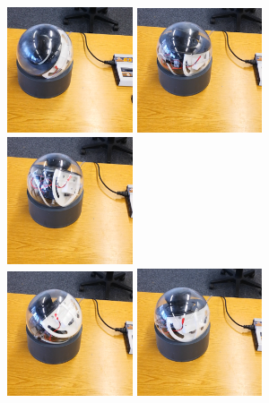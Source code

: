 \begin{figure}
	\centering
	\begin{minipage}[c]{0.45\textwidth}
		\centering
		\includegraphics[width=0.33\textwidth, height=0.33\textwidth]{./images/sphere-frame-1.eps}\hfill
		\includegraphics[width=0.33\textwidth, height=0.33\textwidth]{./images/sphere-frame-2.eps}\hfill
		\includegraphics[width=0.33\textwidth, height=0.33\textwidth]{./images/sphere-frame-3.eps}\\
		\includegraphics[width=0.33\textwidth, height=0.33\textwidth]{./images/sphere-frame-4.eps}\hfill
		\includegraphics[width=0.33\textwidth, height=0.33\textwidth]{./images/sphere-frame-5.eps}\hfill

\end{minipage}
\end{figure}
